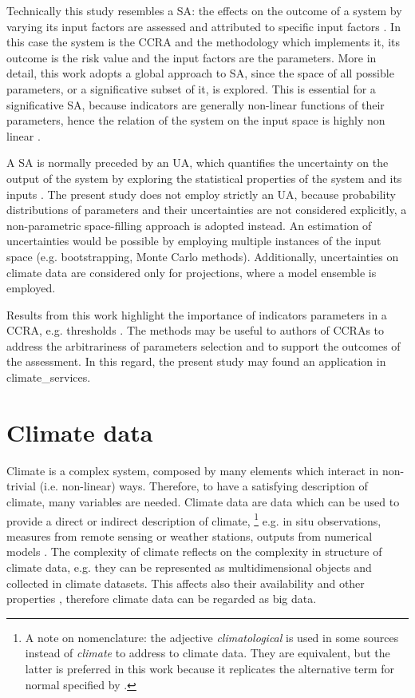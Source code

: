 Technically this study resembles a \gls{SA}: the effects on the outcome of a system by varying its input factors are assessed and attributed to specific input factors \cite[627-632]{2015DeanHandbookOf}. In this case the system is the \gls{CCRA} and the methodology which implements it, its outcome is the \gls{risk} value and the input factors are the parameters.
More in detail, this work adopts a global approach to \gls{SA}, since the space of all possible parameters, or a significative subset of it, is explored. This is essential for a significative \gls{SA}, because \glspl{indicator} are generally non-linear functions of their parameters, hence the relation of the system on the input space is highly non linear \cite[31-32]{2019SaltelliWhySo}.

A \gls{SA} is normally preceded by an \gls{UA}, which quantifies the uncertainty on the output of the system by exploring the statistical properties of the system and its inputs \cite[29-30]{2019SaltelliWhySo}. The present study does not employ strictly an \gls{UA}, because probability distributions of parameters and their uncertainties are not considered explicitly, a non-parametric space-filling approach is adopted instead.
An estimation of uncertainties would be possible by employing multiple instances of the input space (e.g. bootstrapping, Monte Carlo methods). Additionally, uncertainties on climate data are considered only for projections, where a model ensemble is employed.

Results from this work highlight the importance of \glspl{indicator} parameters in a \gls{CCRA}, e.g. thresholds \cite[1873-1874]{2021RanasingheClimateChange}. The methods may be useful to authors of \glspl{CCRA} to address the arbitrariness of parameters selection and to support the outcomes of the assessment. In this regard, the present study may found an application in \glspl{climate_service}.



\section{Climate data}
\label{sec:Climate data}
Climate is a complex system, composed by many elements which interact in non-trivial (i.e. non-linear) ways. Therefore, to have a satisfying description of climate, many variables are needed. Climate data are data which can be used to provide a direct or indirect description of climate,%
\footnote{A note on nomenclature: the adjective \emph{climatological} is used in some sources instead of \emph{climate} to address to climate data. They are equivalent, but the latter is preferred in this work because it replicates the alternative term for \gls{normal} specified by \cite[1]{2017WorldMeteorologicalOrganizationWMOWMOGuidelines}.}
e.g. in situ observations, measures from remote sensing or weather stations, outputs from numerical models \cite[1537]{2021SeneviratneWeatherAnd}. The complexity of climate reflects on the complexity in structure of climate data, e.g. they can be represented as multidimensional objects and collected in climate datasets. This affects also their availability and other properties \cite{2014FaghmousABig}, therefore climate data can be regarded as big data.

